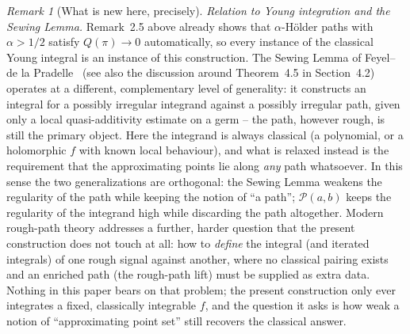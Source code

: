 \documentclass[11pt,fleqn]{article}
\theoremstyle{plain}
\theoremstyle{remark}
\newtheorem{remark}[thm]{Remark}
\begin{document}
\begin{remark}[What is new here, precisely]
\emph{Relation to Young integration and the Sewing Lemma.}
Remark~2.5 above already shows that $\alpha$-H\"older paths with
$\alpha>1/2$ satisfy $Q(\pi)\to0$ automatically, so every instance of
the classical Young integral is an instance of this construction. The
Sewing Lemma of Feyel--de la Pradelle~\cite{FdlP} (see also the
discussion around Theorem~4.5 in Section~4.2) operates at a different,
complementary level of generality: it constructs an integral for a
possibly irregular integrand against a possibly irregular path, given
only a local quasi-additivity estimate on a germ -- the path, however
rough, is still the primary object. Here the integrand is always
classical (a polynomial, or a holomorphic $f$ with known local
behaviour), and what is relaxed instead is the requirement that the
approximating points lie along \emph{any} path whatsoever. In this
sense the two generalizations are orthogonal: the Sewing Lemma weakens
the regularity of the path while keeping the notion of ``a path'';
$\mathcal P(a,b)$ keeps the regularity of the integrand high while
discarding the path altogether. Modern rough-path theory
\cite{Lyons98,FV} addresses a further, harder question that the present
construction does not touch at all: how to \emph{define} the integral
(and iterated integrals) of one rough signal against another, where no
classical pairing exists and an enriched path (the rough-path lift)
must be supplied as extra data. Nothing in this paper bears on that
problem; the present construction only ever integrates a fixed,
classically integrable $f$, and the question it asks is how weak a
notion of ``approximating point set'' still recovers the classical
answer.


\end{remark}
\end{document}
